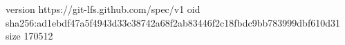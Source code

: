 version https://git-lfs.github.com/spec/v1
oid sha256:ad1ebdf47a5f4943d33c38742a68f2ab83446f2c18fbdc9bb783999dbf610d31
size 170512
